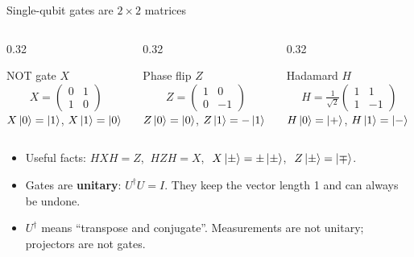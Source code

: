 \documentclass[aspectratio=169,11pt]{beamer}
\newcommand{\key}[1]{{\color{qdark}\textbf{#1}}}
\begin{document}
\begin{frame}{Single-qubit gates are $2\times 2$ matrices}
  \begin{columns}[T]
    \begin{column}{0.32\textwidth}
      \begin{block}{NOT gate $X$}
        \[ X = \begin{pmatrix}0&1\\1&0\end{pmatrix} \]
        $X\ket0 = \ket1$, $X\ket1 = \ket0$
      \end{block}
    \end{column}
    \begin{column}{0.32\textwidth}
      \begin{block}{Phase flip $Z$}
        \[ Z = \begin{pmatrix}1&0\\0&-1\end{pmatrix} \]
        $Z\ket0 = \ket0$, $Z\ket1 = -\ket1$
      \end{block}
    \end{column}
    \begin{column}{0.32\textwidth}
      \begin{block}{Hadamard $H$}
        \[ H = \tfrac{1}{\sqrt2}\begin{pmatrix}1&1\\1&-1\end{pmatrix} \]
        $H\ket0 = \ket+$, $H\ket1 = \ket-$
      \end{block}
    \end{column}
  \end{columns}
  \vspace{3mm}
  \begin{itemize}
    \item Useful facts: $HXH = Z$, $\ HZH = X$, $\ X\ket\pm = \pm\ket\pm$, $\ Z\ket\pm = \ket\mp$.
    \item Gates are \key{unitary}: $U^\dagger U = I$. They keep the vector length 1 and can always be undone.
    \item $U^\dagger$ means ``transpose and conjugate''. Measurements are not unitary; projectors are not gates.
  \end{itemize}
\end{frame}
\end{document}
